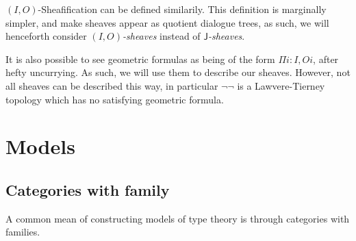 \documentclass[11pt]{article}
\newcommand{\0}{\mathbf{0}}
\newcommand{\1}{\mathbf{1}}
\begin{document}
$(I,O)$-Sheafification can be defined similarily.
This definition is marginally simpler, and make sheaves appear as quotient dialogue trees, as such, we will henceforth consider \emph{$(I,O)$-sheaves} instead of \emph{$\mathsf{J}$-sheaves}.

It is also possible to see geometric formulas as being of the form $\Pi i : I, O i$, after hefty uncurrying.
As such, we will use them to describe our sheaves.
However, not all sheaves can be described this way, in particular $\lnot\lnot$ is a Lawvere-Tierney topology which has no satisfying geometric formula.

\section{Models}\label{Models}

\subsection{Categories with family}

A common mean of constructing models of type theory is through categories with families.
\end{document}
